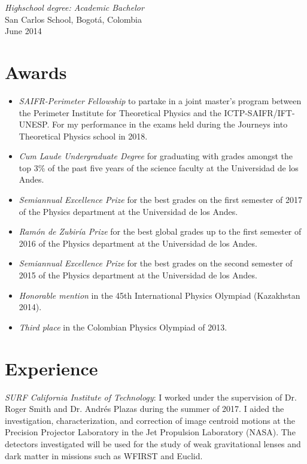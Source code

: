 \documentclass[line,margin]{res}
\begin{document}
\begin{resume}
{\sl Highschool degree: Academic Bachelor} \\
San Carlos School, Bogotá, Colombia \\
June 2014

\section{Awards}

\begin{itemize}

\item{\sl SAIFR-Perimeter Fellowship} to partake in a joint master's program between the Perimeter Institute for Theoretical Physics and the ICTP-SAIFR/IFT-UNESP. For my performance in the exams held during the Journeys into Theoretical Physics school in 2018.

\item {\sl Cum Laude Undergraduate Degree} for graduating with grades amongst the top 3\% of the past five years of the science faculty at the Universidad de los Andes.  

\item {\sl Semiannual Excellence Prize} for the best grades on the first semester of 2017 of the Physics department at the Universidad de los Andes.

\item {\sl Ramón de Zubiría Prize} for the best global grades up to the first semester of 2016 of the Physics department at the Universidad de los Andes.

\item {\sl Semiannual Excellence Prize} for the best grades on the second semester of 2015 of the Physics department at the Universidad de los Andes.

\item {\sl Honorable mention} in the 45th International Physics Olympiad (Kazakhstan 2014).

\item {\sl Third place} in the Colombian Physics Olympiad of 2013.

\end{itemize}

\section{Experience}

{\sl SURF California Institute of Technology}: I worked under the supervision of Dr. Roger Smith and Dr. Andrés Plazas during the summer of 2017. I aided the investigation, characterization, and correction of image centroid motions at the Precision Projector Laboratory in the Jet Propulsion Laboratory (NASA). The detectors investigated will be used for the study of weak gravitational lenses and dark matter in missions such as WFIRST and Euclid.


\end{resume}
\end{document}
